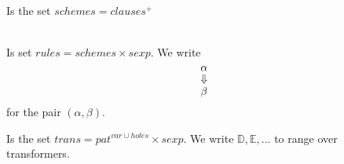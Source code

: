 \begin{definition}[Schemes] \ \\
  Is the set $schemes = clauses^{+}$
\end{definition}

\begin{definition} \ \\
  Is set $rules = schemes \times sexp$. We write
  \[
  \shortstack[ccc]{$\alpha$ \\ $\Downarrow$ \\ $\beta$}
  \]
  for the pair $(\alpha, \beta)$.
\end{definition}

\begin{definition}[Transformers]
  Is the set $trans = pat^{var \cup holes} \times sexp$. We write $\mathbb{D},
  \mathbb{E}, \ldots$ to range over transformers.
\end{definition}

